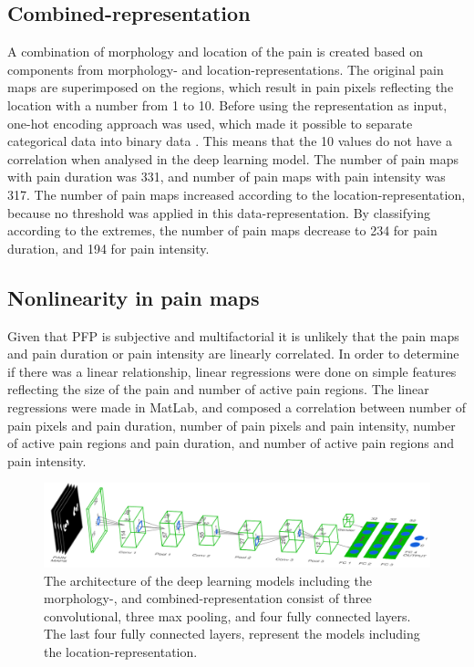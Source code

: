 \subsection*{\textbf{Combined-representation}} 
A combination of morphology and location of the pain is created based on components from morphology- and location-representations. The original pain maps are superimposed on the regions, which result in pain pixels reflecting the location with a number from 1 to 10. Before using the representation as input, one-hot encoding approach was used, which made it possible to separate categorical data into binary data \citep{Harris2012}. This means that the 10 values do not have a correlation when analysed in the deep learning model. The number of pain maps with pain duration was 331, and number of pain maps with pain intensity was 317. The number of pain maps increased according to the location-representation, because no threshold was applied in this data-representation. By classifying according to the extremes, the number of pain maps decrease to 234 for pain duration, and 194 for pain intensity.

\subsection*{\textbf{Nonlinearity in pain maps}} 
Given that PFP is subjective and multifactorial it is unlikely that the pain maps and pain duration or pain intensity are linearly correlated. In order to determine if there was a linear relationship, linear regressions were done on simple features reflecting the size of the pain and number of active pain regions. The linear regressions were made in MatLab, and composed a correlation between number of pain pixels and pain duration, number of pain pixels and pain intensity, number of active pain regions and pain duration, and number of active pain regions and pain intensity.

\begin{figure} [t!]
\centering
\includegraphics[width=1\textwidth]{Figures/models}
\caption{The architecture of the deep learning models including the morphology-, and combined-representation consist of three convolutional, three max pooling, and four fully connected layers. The last four fully connected layers, represent the models including the location-representation.}
\label{fig:models}
\end{figure}

